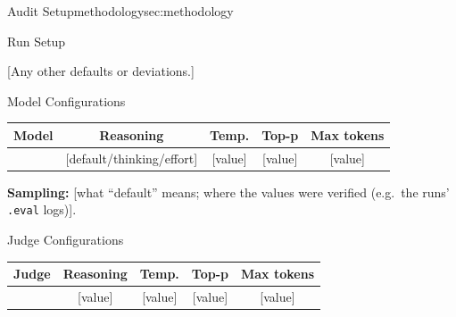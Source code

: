 \begin{maincontentstyled}
\begin{reportpart}{Audit Setup}{methodology}{sec:methodology}
\noindent
\begin{dsbox}[top=1mm, bottom=1mm, before skip=3pt, after skip=3pt]{Run Setup}
  \par\smallskip
  {\small [Any other defaults or deviations.]}
\end{dsbox}

\noindent
\begin{dsbox}[top=1mm, bottom=1mm, before skip=3pt, after skip=3pt]{Model Configurations}
\renewcommand{\arraystretch}{1.05}%
\small
\noindent\begin{tabularx}{\linewidth}{|L{1.15}|C{1.35}|C{0.75}|C{0.75}|C{1.0}|}
\hline
\textbf{Model} & \textbf{Reasoning} & \textbf{Temp.} & \textbf{Top-p} & \textbf{Max tokens} \\
\hline
[model] & [default/thinking/effort] & [value] & [value] & [value] \\ \hline
\end{tabularx}
\smallskip

{\small \textbf{Sampling:} [what ``default'' means; where the values
were verified (e.g.\ the runs' \texttt{.eval} logs)].}
\end{dsbox}

\noindent
\begin{dsbox}[top=1mm, bottom=1mm, before skip=3pt, after skip=3pt]{Judge Configurations}
\renewcommand{\arraystretch}{1.1}%
\small
\noindent\begin{tabularx}{\linewidth}{|L{1.4}|C{1.0}|C{0.7}|C{0.7}|C{1.2}|}
\hline
\textbf{Judge} & \textbf{Reasoning} & \textbf{Temp.} & \textbf{Top-p} & \textbf{Max tokens} \\
\hline
[judge] & [value] & [value] & [value] & [value] \\ \hline
\end{tabularx}
\smallskip


\end{dsbox}
\end{reportpart}
\end{maincontentstyled}
